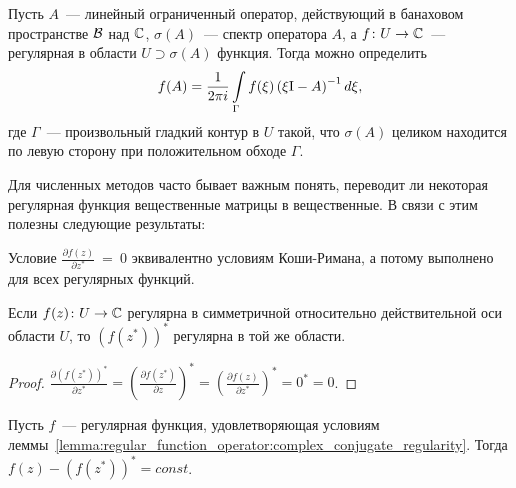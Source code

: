 \begin{definition}
    \label{definition:regular_function_operator:regular_function_operator}
    Пусть $ A $~--- линейный ограниченный оператор, действующий в банаховом пространстве $ \mathcal{B} $ над $ \mathbb{C} $,
    $ \sigma(A) $~--- спектр оператора $ A $, а
    $ f \colon U \to \mathbb{C} $~--- регулярная в области $ U \supset \sigma(A) $ функция.
    Тогда можно определить
    \begin{equation}
        \label{eq:regular_function_operator:regular_function_operator}
        f(A) = \frac{1}{2 \pi i} \int\limits_{\Gamma} f(\xi) \left( \xi \mathrm{I} - A \right)^{-1} d \xi,
    \end{equation}
    где $ \Gamma $~--- произвольный гладкий контур в $ U $ такой,
    что $ \sigma(A) $ целиком находится по левую сторону при положительном обходе $ \Gamma $.
\end{definition}

Для численных методов часто бывает важным понять,
переводит ли некоторая регулярная функция вещественные матрицы в вещественные.
В связи с этим полезны следующие результаты:

\begin{remark}
    \label{remark:regular_function_operator:Wirtinger_derivative}
    Условие $ \frac{\partial f(z)}{\partial z^*}~=~0 $ эквивалентно условиям Коши-Римана,
    а потому выполнено для всех регулярных функций.
\end{remark}


\begin{lemma}
    \label{lemma:regular_function_operator:complex_conjugate_regularity}
    Если $ f(z) \colon U \to \mathbb{C} $ регулярна в симметричной относительно действительной оси области $ U $,
    то $ (f(z^*))^* $ регулярна в той же области.
\end{lemma}

\begin{proof}
    $ \frac{\partial (f(z^*))^*}{\partial z^*} = \left( \frac{\partial f(z^*)}{\partial z} \right)^* =
    \left( \frac{\partial f(z)}{\partial z^*} \right)^* = 0^* = 0 $.
\end{proof}


\begin{corollary}
    \label{corollary:regular_function_operator:sum_with_conjugated_is_constant}
    Пусть $ f $~--- регулярная функция, удовлетворяющая условиям
    леммы~\ref{lemma:regular_function_operator:complex_conjugate_regularity}.
    Тогда $ f(z) - (f(z^*))^* = const $.
\end{corollary}

